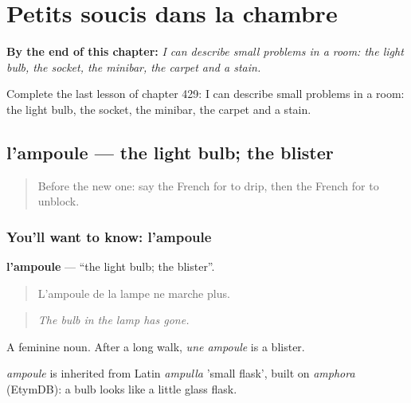 
\chapter{Petits soucis dans la chambre}
\label{ch:fr-petits-soucis-dans-la-chambre}

\begin{chapteropening}
\textbf{By the end of this chapter:} \emph{I can describe small problems in a room: the light bulb, the socket, the minibar, the carpet and a stain.}

Complete the last lesson of chapter 429: I can describe small problems in a room: the light bulb, the socket, the minibar, the carpet and a stain.
\end{chapteropening}

\section[l'ampoule]{l'ampoule — the light bulb; the blister}

\label{lesson:FR-C429-ampoule}



\begin{quote}
Before the new one: say the French for to drip, then the French for to unblock.
\end{quote}

\subsection*{You'll want to know: l'ampoule}
\textbf{l'ampoule} — \textquotedblleft{}the light bulb; the blister\textquotedblright{}.

\begin{quote}
L'ampoule de la lampe ne marche plus.
\end{quote}

\begin{quote}
\emph{The bulb in the lamp has gone.}
\end{quote}

A feminine noun. After a long walk, \emph{une ampoule} is a blister.

\begin{cousinweb}
\emph{ampoule} is inherited from Latin \emph{ampulla} 'small flask', built on \emph{amphora} (EtymDB): a bulb looks like a little glass flask.
\end{cousinweb}

